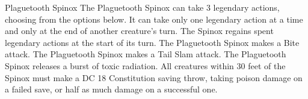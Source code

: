 \begin{DndMonster}[width=0.5\textwidth]{Plaguetooth Spinox}
    The Plaguetooth Spinox can take 3 legendary actions, choosing from the options below. It can take only one legendary action at a time and only at the end of another creature's turn. The Spinox regains spent legendary actions at the start of its turn.
    The Plaguetooth Spinox makes a Bite attack.
    The Plaguetooth Spinox makes a Tail Slam attack.
    The Plaguetooth Spinox releases a burst of toxic radiation. All creatures within 30 feet of the Spinox must make a DC 18 Constitution saving throw, taking  poison damage on a failed save, or half as much damage on a successful one.
\end{DndMonster}